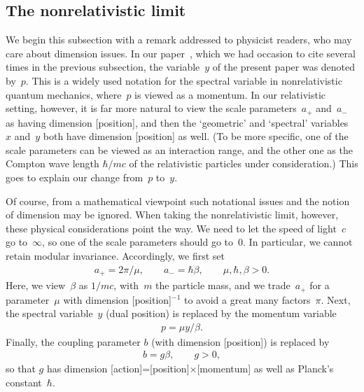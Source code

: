 \documentclass[pdftex]{sigma}
\numberwithin{equation}{section}
\begin{document}
\subsection{The nonrelativistic limit}\label{section4.2}

We begin this subsection with a remark addressed to physicist readers, who may care about dimension issues. In our paper~\cite{GLFII}, which we had occasion to cite several times in the previous subsection, the variable~$y$ of the present paper was denoted by~$p$. This is a widely used notation for the spectral variable in nonrelativistic quantum mechanics, where~$p$  is viewed as a momentum. In our relativistic setting, however, it is far more natural to view the scale parameters~$a_{+}$ and~$a_-$ as having dimension [position], and then the `geometric' and `spectral' variables~$x$ and~$y$ both have dimension [position] as well. (To be more specif\/ic, one of the scale parameters can be viewed as an interaction range, and the other one as the Compton wave length $\hbar/mc$ of the relativistic particles under consideration.) This goes to explain our change from~$p$ to~$y$.

Of course, from a mathematical viewpoint such notational issues and the notion of dimension may be ignored. When taking the nonrelativistic limit, however, these physical considerations point the way. We need to let the speed of light~$c$ go to~$\infty$, so one of the scale parameters should go to~0. In particular, we cannot retain modular invariance. Accordingly, we f\/irst set
\begin{gather}\label{repar}
a_+= 2\pi/\mu,\qquad  a_-= \hbar \beta,\qquad \mu,\hbar,\beta >0.
\end{gather}
Here, we view~$\beta$ as $1/mc$, with~$m$ the particle mass, and we trade~$a_+$ for a parameter~$\mu$ with dimension [position]$^{-1}$ to avoid a great many factors~$\pi$. Next, the spectral variable~$y$ (dual position) is replaced by the momentum variable
\begin{gather}\label{pdef}
p= \mu y/\beta.
\end{gather}
Finally, the coupling parameter $b$ (with dimension [position]) is replaced by
\begin{gather}\label{bg}
b=g\beta,\qquad g>0,
\end{gather}
so that $g$ has dimension [action]=[position]$\times$[momentum] as well as Planck's constant~$\hbar$.
\end{document}
